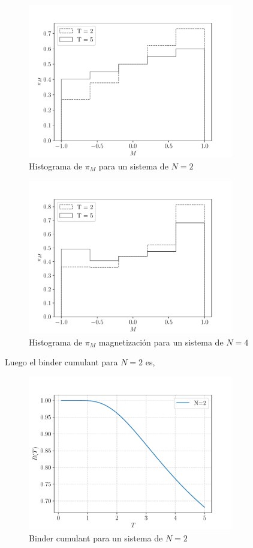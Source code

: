 \documentclass[11pt,a4paper]{article}
\begin{document}
\begin{figure}[H]
    \centering
    \includegraphics[width=0.8\textwidth]{p2/b/N2_pi_m.pdf}
    \caption{Histograma de $\pi_M$ para un sistema de $N=2$}
    \label{fig:p2_6}
\end{figure}

\begin{figure}[H]
    \centering
    \includegraphics[width=0.8\textwidth]{p2/b/N4_pi_m.pdf}
    \caption{Histograma de $\pi_M$ magnetización para un sistema de $N=4$}
    \label{fig:p2_6}
\end{figure}

Luego el binder cumulant para $N = 2$ es,
\begin{figure}[H]
    \centering
    \includegraphics[width=0.8\textwidth]{p2/N2_binder.pdf}
    \caption{Binder cumulant para un sistema de $N=2$}
    \label{fig:p2_7}
\end{figure}
\end{document}
